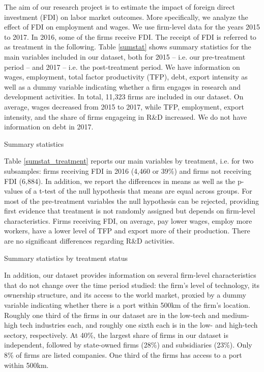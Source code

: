 The aim of our research project is to estimate the impact of foreign direct investment (FDI) on labor market outcomes. More specifically, we analyze the effect of FDI on employment and wages. We use firm-level data for the years 2015 to 2017. In 2016, some of the firms receive FDI. The receipt of FDI is referred to as treatment in the following. Table \ref{sumstat} shows summary statistics for the main variables included in our dataset, both for 2015 -- i.e. our pre-treatment period -- and 2017 -- i.e. the post-treatment  period. We have information on wages, employment, total factor productivity (TFP), debt, export intensity as well as a dummy variable indicating whether a firm engages in research and development activities. In total, 11,323 firms are included in our dataset. On average, wages decreased from 2015 to 2017, while TFP, employment, export intensity, and the share of firms engageing in R\&D  increased. We do not have information on debt in 2017. \\ \par 


\begin{table}[htbp]\centering \caption{Summary statistics\label{sumstat}}

 \end{table}


Table \ref{sumstat_treatment} reports our main variables by treatment, i.e. for two subsamples: firms receiving FDI in 2016 (4,460 or 39\%)  and firms not receiving FDI (6,884). In addition, we report the differences in means as well as the p-values of a t-test of the null hypothesis that means are equal across groups. For most of the pre-treatment variables the null hypothesis can be rejected, providing first evidence that treatment is not randomly assigned but depends on firm-level characteristics. Firms receiving FDI, on average, pay lower wages, employ more workers, have a lower level of TFP and export more of their production. There are no significant differences regarding R\&D activities.  \\ \par 

\begin{table}[htbp]\centering \caption{Summary statistics by treatment status\label{sumstat_treatment}}

\end{table} 


In addition, our dataset provides information on several firm-level characteristics that do not change over the time period studied: the firm's level of technology, its ownership structure, and its access to the world market, proxied by a dummy variable indicating whether there is a port within 500km of the firm's location. Roughly one third of the firms in our dataset are in the low-tech and medium-high tech industries each, and roughly one sixth each is in the low- and high-tech sectory, respectively. At 40\%, the largest share of firms in our dataset is independent, followed by state-owned firms (28\%) and subsidiaries (23\%). Only 8\% of firms are listed companies. One third of the firms has access to a port within 500km. \\ \par


